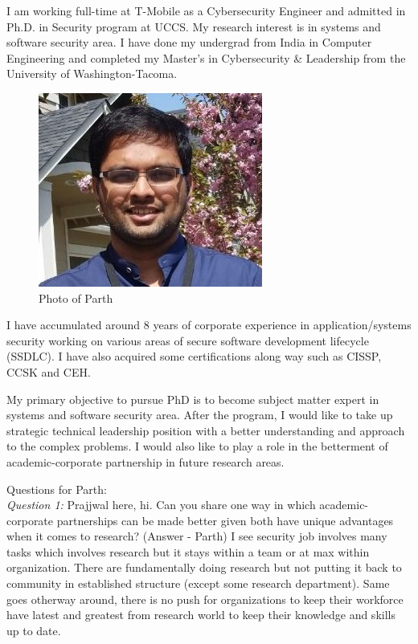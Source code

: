 I am working full-time at T-Mobile as a Cybersecurity Engineer and admitted in Ph.D. in Security program at UCCS. 
My research interest is in systems and software security area. 
I have done my undergrad from India in Computer Engineering and completed my Master’s in Cybersecurity \& Leadership from the University of Washington-Tacoma. 
\begin{figure}[h!]
\centering
\includegraphics[scale=0.5]{parth_shah.jpg}
\caption{Photo of Parth}
\label{fig:profile}
\end{figure}
I have accumulated around 8 years of corporate experience in application/systems security working on various areas of secure software development lifecycle (SSDLC). 
I have also acquired some certifications along way such as CISSP, CCSK and CEH.  


My primary objective to pursue PhD is to become subject matter expert in systems and software security area. 
After the program, I would like to take up strategic technical leadership position with a better understanding and approach to the complex problems. 
I would also like to play a role in the betterment of academic-corporate partnership in future research areas.

Questions for Parth:\\
\textit{Question 1: }Prajjwal here, hi. Can you share one way in which academic-corporate partnerships can be made better given both have unique advantages when it comes to research?
(Answer - Parth) I see security job involves many tasks which involves research but it stays within a team or at max within organization. 
There are fundamentally doing research but not putting it back to community in established structure (except some research department). 
Same goes otherway around, there is no push for organizations to keep their workforce have latest and greatest from research world to keep their knowledge and skills up to date.
